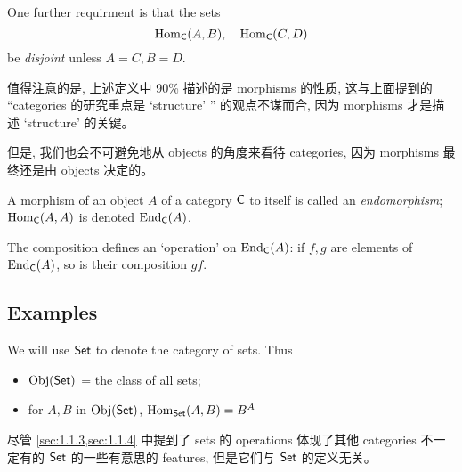One further requirment is that the sets
\[
    \operatorname{Hom}_{\operatorname{\mathsf{C}}}(A, B), \quad \operatorname{Hom}_{\operatorname{\mathsf{C}}}(C, D)
\]
be \emph{disjoint} unless \(A = C, B = D\).

\begin{note}
    值得注意的是, 上述定义中 90\% 描述的是 morphisms 的性质, 这与上面提到的 ``categories 的研究重点是 `structure' '' 的观点不谋而合, 因为 morphisms 才是描述 `structure' 的关键。

    但是, 我们也会不可避免地从 objects 的角度来看待 categories, 因为 morphisms 最终还是由 objects 决定的。
\end{note}

\begin{definition}[Endomorphism]\label{def:endomorphism}
    A morphism of an object \(A\) of a category \(\operatorname{\mathsf{C}}\) to itself is called an \emph{endomorphism}; \(\operatorname{Hom}_{\operatorname{\mathsf{C}}}(A, A)\) is denoted \(\operatorname{End}_{\operatorname{\mathsf{C}}}(A)\).
    \begin{note}
        The composition defines an `operation' on \(\operatorname{End}_{\operatorname{\mathsf{C}}}(A)\): if \(f, g\) are elements of \(\operatorname{End}_{\operatorname{\mathsf{C}}}(A)\), so is their composition \(gf\).
    \end{note}
\end{definition}

\subsection{Examples}\label{sec:1.3.2}

\begin{eg}[Set]\label{eg:1.3.2}
    We will use \(\operatorname{\mathsf{Set}}\) to denote the category of sets. Thus
    \begin{itemize}
        \item \(\operatorname{Obj}(\operatorname{\mathsf{Set}})\) = the class of all sets;
        \item for \(A, B\) in \(\operatorname{Obj}(\operatorname{\mathsf{Set}})\), \(\operatorname{Hom}_{\operatorname{\mathsf{Set}}}(A, B) = B^A\)
    \end{itemize}

    \begin{note}
        尽管 \cref{sec:1.1.3,sec:1.1.4} 中提到了 sets 的 operations 体现了其他 categories 不一定有的 \(\operatorname{\mathsf{Set}}\) 的一些有意思的 features, 但是它们与 \(\operatorname{\mathsf{Set}}\) 的定义无关。
    \end{note}
\end{eg}

